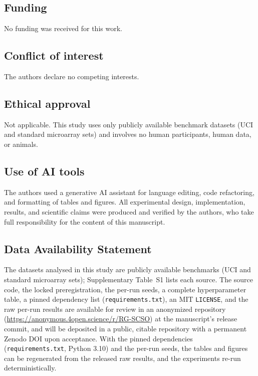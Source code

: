 \documentclass[iicol,sn-basic,pdflatex]{sn-jnl}
\begin{document}
\subsection*{Funding}
No funding was received for this work.

\subsection*{Conflict of interest}
The authors declare no competing interests.

\subsection*{Ethical approval}
Not applicable. This study uses only publicly available benchmark datasets
(UCI and standard microarray sets) and involves no human participants,
human data, or animals.

\subsection*{Use of AI tools}
The authors used a generative AI assistant for language editing, code
refactoring, and formatting of tables and figures. All experimental design,
implementation, results, and scientific claims were produced and verified by
the authors, who take full responsibility for the content of this manuscript.

\subsection*{Data Availability Statement}
The datasets analysed in this study are publicly available benchmarks (UCI
and standard microarray sets); Supplementary Table~S1 lists each source. The
source code, the locked preregistration, the per-run seeds, a complete
hyperparameter table, a pinned dependency list (\texttt{requirements.txt}),
an MIT \texttt{LICENSE}, and the raw per-run results are available for review
in an anonymized repository (\url{https://anonymous.4open.science/r/RG-SCSO})
at the manuscript's release commit, and will be deposited in a public, citable
repository with a permanent Zenodo DOI upon acceptance. With the pinned
dependencies (\texttt{requirements.txt}, Python 3.10) and the per-run seeds,
the tables and figures can be regenerated from the released raw results, and
the experiments re-run deterministically.


\end{document}
